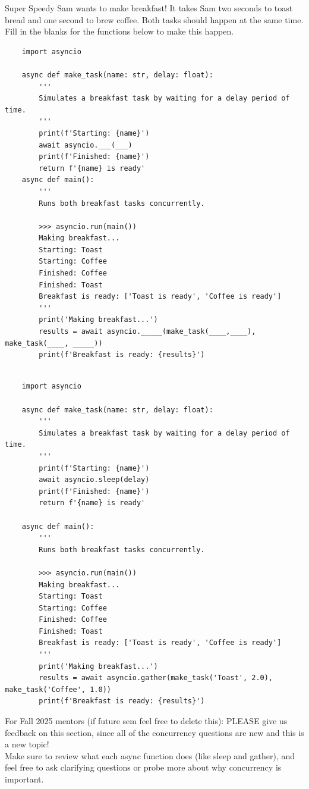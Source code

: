 \question Super Speedy Sam wants to make breakfast! It takes Sam two seconds to toast bread and one second to brew coffee. Both tasks should happen at the same time. Fill in the blanks for the functions below to make this happen. 

\begin{lstlisting}
    import asyncio

    async def make_task(name: str, delay: float):
        '''
        Simulates a breakfast task by waiting for a delay period of time. 
        '''
        print(f'Starting: {name}')
        await asyncio.___(___)
        print(f'Finished: {name}')
        return f'{name} is ready'
    async def main():
        '''
        Runs both breakfast tasks concurrently.
        
        >>> asyncio.run(main())
        Making breakfast...
        Starting: Toast
        Starting: Coffee
        Finished: Coffee
        Finished: Toast
        Breakfast is ready: ['Toast is ready', 'Coffee is ready']
        '''
        print('Making breakfast...')
        results = await asyncio._____(make_task(____,____), make_task(____, _____))
        print(f'Breakfast is ready: {results}')
\end{lstlisting}

\begin{solution}[1in]
\begin{lstlisting}

    import asyncio

    async def make_task(name: str, delay: float):
        '''
        Simulates a breakfast task by waiting for a delay period of time.  
        '''
        print(f'Starting: {name}')
        await asyncio.sleep(delay)
        print(f'Finished: {name}')
        return f'{name} is ready'

    async def main():
        '''
        Runs both breakfast tasks concurrently.
        
        >>> asyncio.run(main())
        Making breakfast...
        Starting: Toast
        Starting: Coffee
        Finished: Coffee
        Finished: Toast
        Breakfast is ready: ['Toast is ready', 'Coffee is ready']
        '''
        print('Making breakfast...')
        results = await asyncio.gather(make_task('Toast', 2.0), make_task('Coffee', 1.0))
        print(f'Breakfast is ready: {results}')
\end{lstlisting}
For Fall 2025 mentors (if future sem feel free to delete this): PLEASE give us feedback on this section, since all of the concurrency questions are new and this is a new topic! \\
Make sure to review what each async function does (like sleep and gather), and feel free to ask clarifying questions or probe more about why concurrency is important. 
\end{solution}


        



    
    